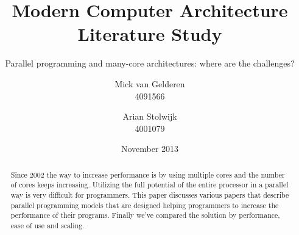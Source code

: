\documentclass{scrartcl}
\title{Modern Computer Architecture\\Literature Study}
\subtitle{Parallel programming and many-core architectures: where are the challenges?}
\author{%
    Mick van Gelderen\\4091566
    \and
    Arian Stolwijk\\4001079
}
\date{November 2013}
\begin{document}
\maketitle

\begin{abstract}
    Since 2002 the way to increase performance is by using multiple cores and
    the number of cores keeps increasing. Utilizing the full potential of the
    entire processor in a parallel way is very difficult for programmers. This
    paper discusses various papers that describe parallel programming models
    that are designed helping programmers to increase the performance of their
    programs. Finally we've compared the solution by performance, ease of use
    and scaling.
\end{abstract}








\end{document}
